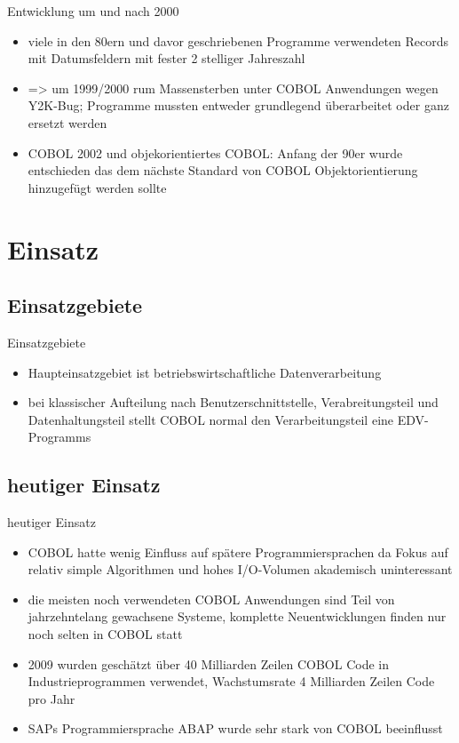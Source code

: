 \documentclass[handout]{beamer}
\begin{document}
\begin{frame}{Entwicklung um und nach 2000}
		\begin{itemize}
			\item
				viele in den 80ern und davor geschriebenen Programme verwendeten Records mit Datumsfeldern mit fester 2 stelliger Jahreszahl
			\item
				=> um 1999/2000 rum Massensterben unter COBOL Anwendungen wegen Y2K-Bug; Programme mussten entweder grundlegend überarbeitet oder ganz ersetzt werden 
			\item
				COBOL 2002 und objekorientiertes COBOL: Anfang der 90er wurde entschieden das dem n\"achste Standard von COBOL Objektorientierung hinzugef\"ugt werden sollte
		\end{itemize}
\end{frame}

\section{Einsatz}

\subsection{Einsatzgebiete}

\begin{frame}{Einsatzgebiete}
	\begin{itemize}
		\item
			Haupteinsatzgebiet ist betriebswirtschaftliche Datenverarbeitung
		\item
			bei klassischer Aufteilung nach Benutzerschnittstelle, Verabreitungsteil und Datenhaltungsteil stellt COBOL normal den Verarbeitungsteil eine EDV-Programms
	\end{itemize}
\end{frame}

\subsection{heutiger Einsatz}

\begin{frame}{heutiger Einsatz}
	\begin{itemize}
		\item
			COBOL hatte wenig Einfluss auf sp\"atere Programmiersprachen da Fokus auf relativ simple Algorithmen und hohes I/O-Volumen akademisch uninteressant
		\item
			die meisten noch verwendeten COBOL Anwendungen sind Teil von jahrzehntelang gewachsene Systeme, komplette Neuentwicklungen finden nur noch selten in COBOL statt
		\item
			2009 wurden geschätzt \"uber 40 Milliarden Zeilen COBOL Code in Industrieprogrammen verwendet, Wachstumsrate 4 Milliarden Zeilen Code pro Jahr
		\item
			SAPs Programmiersprache ABAP wurde sehr stark von COBOL beeinflusst
	\end{itemize}
\end{frame}
\end{document}
